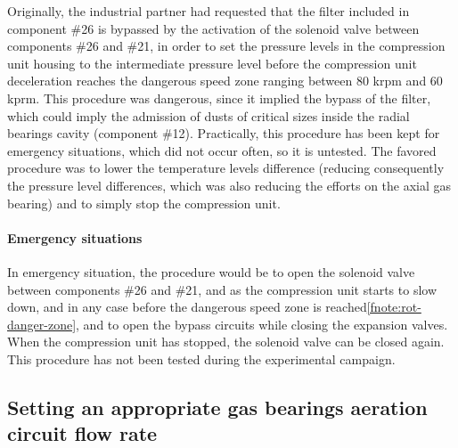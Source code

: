 Originally, the industrial partner had requested that the filter
included in component \#26 is bypassed by the activation of the
solenoid valve between components \#26 and \#21, in order to set the
pressure levels in the compression unit housing to the intermediate
pressure level before the compression unit deceleration reaches the
dangerous speed zone ranging between 80 krpm and 60
kprm. This procedure was dangerous, since it
implied the bypass of the filter, which could imply the admission of
dusts of critical sizes inside the radial bearings
cavity (component \#12). Practically,
this procedure has been kept for emergency situations, which did not
occur often, so it is untested. The favored procedure was to lower the
temperature levels difference (reducing consequently the pressure
level differences, which was also reducing the efforts on the axial
gas bearing) and to simply stop the compression unit.

\paragraph{Emergency situations}

In emergency situation, the procedure would be to open the solenoid
valve between components \#26 and \#21, and as the compression unit
starts to slow down, and in any case before the dangerous speed zone
is reached\cref{fnote:rot-danger-zone}, and to open the bypass
circuits while closing the expansion valves. When the compression unit
has stopped, the solenoid valve can be closed again. This procedure
has not been tested during the experimental campaign.


\subsection{Setting an appropriate gas bearings
  aeration circuit flow rate}
\label{sec:awp-issue-bearings-aeration}


